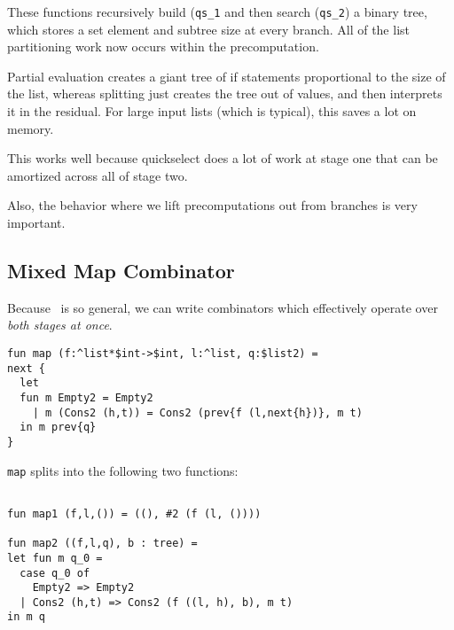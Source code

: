 These functions recursively build ({\tt qs\_1} and then search ({\tt qs\_2}) a binary tree,
which stores a set element and subtree size at every branch.
All of the list partitioning work now occurs within the precomputation.

Partial evaluation creates a giant tree of if statements proportional to the size of the list,
whereas splitting just creates the tree out of values, and then interprets it in the residual.
For large input lists (which is typical), this saves a lot on memory.

This works well because quickselect does a lot of work at stage one that can be amortized across all of stage two.

Also, the behavior where we lift precomputations out from branches is very important.

\subsection {Mixed Map Combinator}

Because \lang\ is so general, we can write combinators which effectively operate over {\em both stages at once}.

\begin{lstlisting} 
fun map (f:^list*$int->$int, l:^list, q:$list2) = 
next {
  let 
  fun m Empty2 = Empty2
    | m (Cons2 (h,t)) = Cons2 (prev{f (l,next{h})}, m t)
  in m prev{q}
}
\end{lstlisting}

\noindent
{\tt map} splits into the following two functions:

\begin{lstlisting} 

fun map1 (f,l,()) = ((), #2 (f (l, ())))

fun map2 ((f,l,q), b : tree) = 
let fun m q_0 =
  case q_0 of 
    Empty2 => Empty2 
  | Cons2 (h,t) => Cons2 (f ((l, h), b), m t)
in m q
\end{lstlisting}